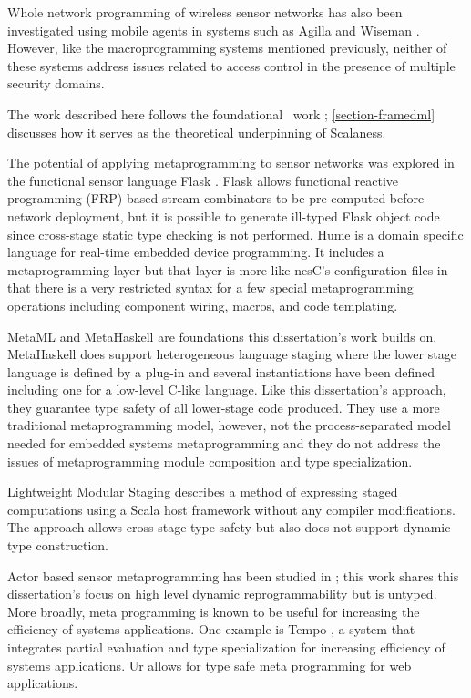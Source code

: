 Whole network programming of wireless sensor networks has also been investigated using mobile
agents in systems such as Agilla \cite{Fok:2009:AMA:1552297.1552299} and Wiseman
\cite{Gonzalez-Valenzuela:2010:PMW:1891545.1891566}. However, like the macro\-programming
systems mentioned previously, neither of these systems address issues related to access control
in the presence of multiple security domains.


The work described here follows the foundational \fml\ work \cite{FramedML};
\autoref{section-framedml} discusses how it serves as the theoretical underpinning of Scalaness.

The potential of applying metaprogramming to sensor networks was explored in the functional
sensor language Flask \cite{Mainland-Flask-2008}. Flask allows functional reactive programming
(FRP)-based stream combinators to be pre-computed before network deployment, but it is possible
to generate ill-typed Flask object code since cross-stage static type checking is not performed.
Hume \cite{Hume} is a domain specific language for real-time embedded device programming. It
includes a metaprogramming layer but that layer is more like nesC's configuration files in that
there is a very restricted syntax for a few special metaprogramming operations including
component wiring, macros, and code templating.

MetaML \cite{Taha-MetaML,DBLP:conf/icess/Taha04} and MetaHaskell \cite{mainland12} are
foundations this dissertation's work builds on. MetaHaskell does support heterogeneous language staging where the
lower stage language is defined by a plug-in and several instantiations have been defined
including one for a low-level C-like language. Like this dissertation's approach, they guarantee type safety of
all lower-stage code produced. They use a more traditional metaprogramming model, however, not
the process-separated model needed for embedded systems metaprogramming and they do not address the
issues of metaprogramming module composition and type specialization.

Lightweight Modular Staging \cite{Rompf-LMS} describes a method of expressing staged
computations using a Scala host framework without any compiler modifications. The approach
allows cross-stage type safety but also does not support dynamic type construction.

Actor based sensor metaprogramming has been studied in \cite{cheong07}; this work shares this dissertation's 
focus on high level dynamic reprogrammability but is untyped. More broadly, meta programming is
known to be useful for increasing the efficiency of systems applications. One example is Tempo
\cite{289140}, a system that integrates partial evaluation and type specialization for
increasing efficiency of systems applications. Ur \cite{UrPLDI10} allows for type safe meta
programming for web applications.

